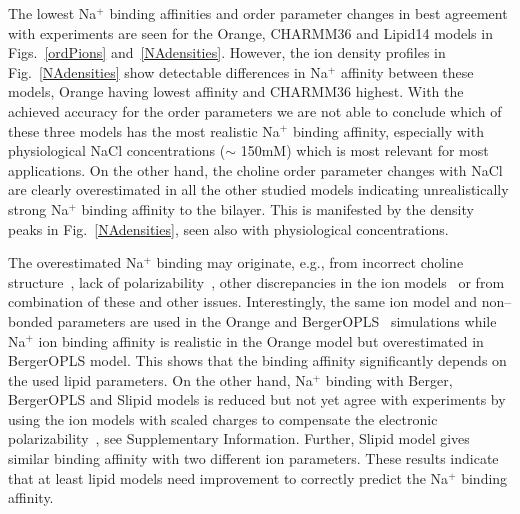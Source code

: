 \documentclass[pre,aps,floatfix,authordate1-4,twocolumn]{revtex4-1}
\begin{document}
The lowest Na$^+$ binding affinities and order parameter changes in best agreement with experiments are seen for the Orange,
CHARMM36 and Lipid14 models in Figs.~\ref{ordPions} and~\ref{NAdensities}. However, the ion density profiles in Fig.~\ref{NAdensities} show 
detectable differences in Na$^+$ affinity between these models, Orange having lowest affinity and CHARMM36 highest. 
With the achieved accuracy for the order parameters we are not able to conclude which of these three models has the most realistic 
Na$^+$ binding affinity, especially with physiological NaCl concentrations ($\sim$ 150mM) which is most relevant for most applications. 
On the other hand, the choline order parameter changes with NaCl are clearly overestimated in
all the other studied models indicating unrealistically strong Na$^+$ binding affinity to the bilayer.
This is manifested by the density peaks in Fig.~\ref{NAdensities}, seen also with physiological concentrations. 

The overestimated Na$^+$ binding may originate, e.g., from incorrect choline structure~\cite{botan15}, 
lack of polarizability~\cite{leontyev11}, other discrepancies in the ion models~\cite{hess06,chen07,Reif13} or from
combination of these and other issues. Interestingly, the same ion model and non--bonded parameters
are used in the Orange and BergerOPLS~\cite{tieleman06} simulations while Na$^+$ ion binding affinity
is realistic in the Orange model but overestimated in BergerOPLS model. This shows that the binding 
affinity significantly depends on the used lipid parameters. On the other hand, 
Na$^+$ binding with Berger, BergerOPLS and Slipid models is reduced but not yet agree with experiments 
by using the ion models with scaled charges to compensate the electronic polarizability~\cite{kohagen15,leontyev11}, 
see Supplementary Information. Further, Slipid model gives similar binding affinity with two different
ion parameters. These results indicate that at least lipid models need improvement to 
correctly predict the Na$^+$ binding affinity.

\end{document}
